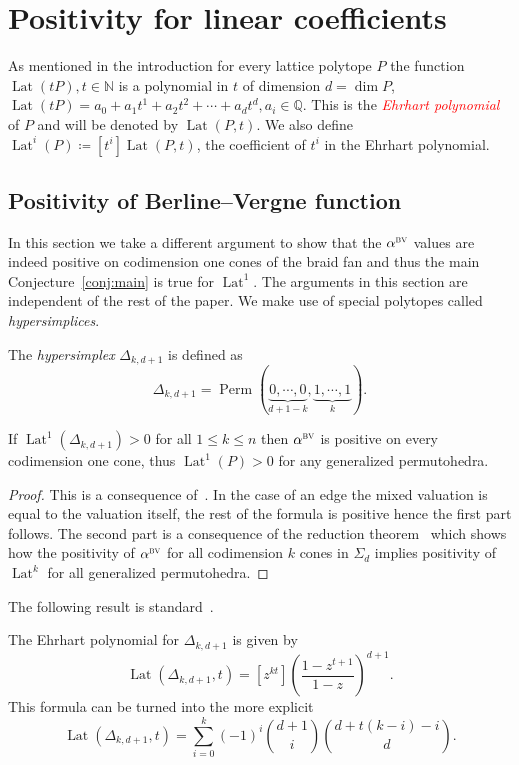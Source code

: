\documentclass[ALCO,ThmDefs,Unicode,epreuves]{cedram}
\newcommand{\important}[1]{\emph{\textcolor{red}{#1}}}
\DeclareMathOperator{\Lat}{Lat}
\DeclareMathOperator{\Perm}{Perm}
\newcommand{\bv}{\alpha^{\textsc{bv}}}
\newcommand{\NN}{{\mathbb{N}}}
\begin{document}


\section{Positivity for linear coefficients}\label{sec:edge} 

As mentioned in the introduction for every lattice polytope $P$ the function $\Lat(tP), t\in \NN$ is a polynomial in $t$ of dimension $d=\dim P$, \ie $\Lat(tP) = a_0+a_1t^1+a_2t^2+\cdots+a_dt^d, a_i\in\mathbb{Q}.$ This is the \important{Ehrhart polynomial} of $P$ and will be denoted by $\Lat(P,t)$. We also define $\Lat^i(P)\coloneqq [t^i]\Lat(P,t)$, the coefficient of $t^i$ in the Ehrhart polynomial.

\subsection{Positivity of Berline--Vergne function}
In this section we take a different argument to show that the $\bv$ values are indeed positive on codimension one cones of the braid fan and thus the main Conjecture~\ref{conj:main} is true for $\Lat^1$. The arguments in this section are independent of the rest of the paper. We make use of special polytopes called \emph{hypersimplices}.
\begin{defi}
	The \emph{hypersimplex} $\Delta_{k,d+1}$ is defined as 
	\[ \Delta_{k,d+1} = \Perm ( \underbrace{0,\cdots,0}_{d+1-k}, \underbrace{1,\cdots,1}_{k} ).\]
\end{defi}

\begin{prop}\label{prop:hyper}
	If $\Lat^1(\Delta_{k,d+1})>0$ for all $1\leq k\leq n$ then $\bv$ is positive on every codimension one cone, thus $\Lat^1(P)>0$ for any generalized permutohedra.
\end{prop}
\begin{proof}
	This is a consequence of~\cite[Theorem~5.5]{bvalpha}. In the case of an edge the mixed valuation is equal to the valuation itself, the rest of the formula is positive hence the first part follows. The second part is a consequence of the reduction theorem~\cite[Theorem~3.5]{bvalpha} which shows how the positivity of $\bv$ for all codimension $k$ cones in $\Sigma_d$ implies positivity of $\Lat^k$ for all generalized permutohedra.
\end{proof}

The following result is standard~\cite[Chapter~4, Ex.~62]{ec1}.
\begin{prop}
	The Ehrhart polynomial for $\Delta_{k,d+1}$ is given by
	\begin{equation}\label{eq:ehrhart}
	\Lat(\Delta_{k,d+1}, t) = [z^{kt}]\left(\dfrac{1-z^{t+1}}{1-z}\right)^{d+1}.
	\end{equation}
	This formula can be turned into the more explicit
	\begin{equation}\label{eq:ugly}
	\Lat(\Delta_{k,d+1}, t) = \sum_{i=0}^k (-1)^i\binom{d+1}{i}\binom{d+t(k-i)-i}{d}.
	\end{equation}
\end{prop}
\end{document}
